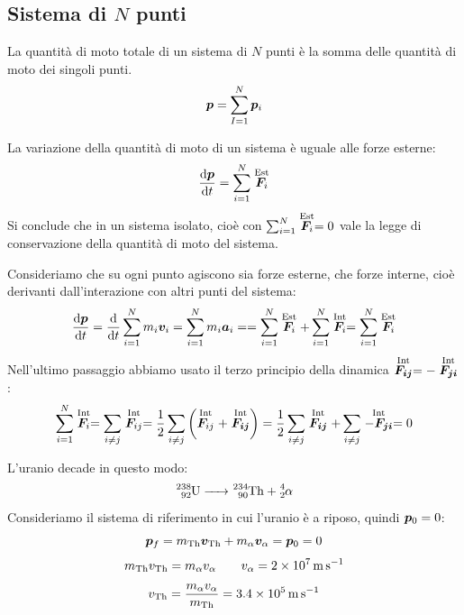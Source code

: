 \subsection{Sistema di \texorpdfstring{$N$}{N} punti}
\begin{Def}
  La quantità di moto totale di un sistema di $N$ punti è la somma delle quantità di moto dei singoli punti.
  \begin{equation}
    \boldsymbol{p}=\sum_{I=1}^N\boldsymbol{p}_i
  \end{equation}
\end{Def}
\begin{Teo}
  La variazione della quantità di moto di un sistema è uguale alle forze esterne:
  \begin{equation}
    \frac{\mathrm{d} \boldsymbol{p}}{\mathrm{d} t}=\sum^N_{i=1}\stackrel{\text{Est}}{\boldsymbol{F}_i}
  \end{equation}
 Si conclude che in un sistema isolato, cioè con
  $\sum^N_{i=1}\stackrel{\text{Est}}{\boldsymbol{F}_i}=0$ vale la legge di
  conservazione della quantità di moto del sistema.
\end{Teo}
Consideriamo che su ogni punto agiscono sia forze esterne, che forze interne, cioè derivanti dall'interazione con altri punti del sistema:
\[
  \frac{\mathrm{d} \boldsymbol{p}}{\mathrm{d} t}  =\frac{\mathrm{d} }{\mathrm{d} t}\sum^N_{i=1}m_i\boldsymbol{v}_i=\sum_{i=1}^{N}m_i\boldsymbol{a}_i=
  =\sum^N_{i=1}\stackrel{\text{Est}}{\boldsymbol{F}_i}+\sum^N_{i=1}\stackrel{\text{Int}}{\boldsymbol{F}_i}=\sum^N_{i=1}\stackrel{\text{Est}}{\boldsymbol{F}_i}\]
Nell'ultimo passaggio abbiamo usato il terzo principio della dinamica $\stackrel{\text{Int}}{\boldsymbol{F_{ij}}} = -\stackrel{\text{Int}}{\boldsymbol{F_{ji}}}$:
\[
  \sum^N_{i=1}\stackrel{\text{Int}}{\boldsymbol{F}_i} = \sum_{i\neq j}\stackrel{\text{Int}}{\boldsymbol{F}_{ij}} = \frac{1}{2}\sum_{i\neq j}\left(\stackrel{\text{Int}}{\boldsymbol{F}_{ij}} + \stackrel{\text{Int}}{\boldsymbol{F_{ij}}}\right) = \frac{1}{2}\sum_{i\neq j}\stackrel{\text{Int}}{\boldsymbol{F_{ij}}} + \sum_{i\neq j}\stackrel{\text{Int}}{-\boldsymbol{F_{ji}}} = 0
  \]

\begin{Es}[decadimento]
  L'uranio decade in questo modo:
  \[\ce{^{238}_{92}U -> ^{234}_{90}Th + ^{4}_{2}\alpha}\]
  Consideriamo il sistema di riferimento in cui l'uranio è a riposo, quindi $\boldsymbol{p}_0=0$:
  \[\ve p_f=m_{\ce{Th}}\ve v_{\ce{Th}}+m_\alpha \ve v_\alpha=\ve p_0=0\]
  \[
    m_{\ce{Th}}v_{\ce{Th}}=m_\alpha v_\alpha\qquad v_\alpha=\SI{2E7}{\metre\per\second}
  \]
  \[
    v_{\ce{Th}}=\frac{m_\alpha v_\alpha}{m_{\ce{Th}}}=\SI{3.4E5}{\metre\per\second}
  \]
\end{Es}

